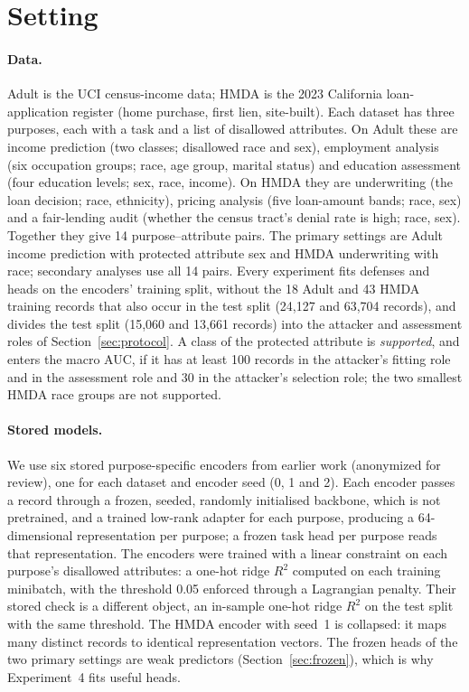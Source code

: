 \documentclass[10pt]{article}
\begin{document}
\section{Setting}\label{sec:setting}

\paragraph{Data.} Adult is the UCI census-income data; HMDA is the 2023 California loan-application register (home
purchase, first lien, site-built). Each dataset has three purposes, each with a task and a list of disallowed attributes.
On Adult these are income prediction (two classes; disallowed race and sex), employment analysis (six occupation groups;
race, age group, marital status) and education assessment (four education levels; sex, race, income). On HMDA they are
underwriting (the loan decision; race, ethnicity), pricing analysis (five loan-amount bands; race, sex) and a
fair-lending audit (whether the census tract's denial rate is high; race, sex). Together they give 14 purpose--attribute
pairs. The primary settings are Adult income prediction with protected attribute sex and HMDA underwriting with race;
secondary analyses use all 14 pairs. Every experiment fits defenses and heads on the encoders' training split, without the 18 Adult and 43 HMDA training
records that also occur in the test split (24{,}127 and 63{,}704 records), and divides the test split (15{,}060 and 13{,}661 records) into the attacker and
assessment roles of Section~\ref{sec:protocol}. A class of the protected attribute is \emph{supported}, and enters the
macro AUC, if it has at least 100 records in the attacker's fitting role and in the assessment role and 30 in the
attacker's selection role; the two smallest HMDA race groups are not supported.

\paragraph{Stored models.} We use six stored purpose-specific encoders from earlier work (anonymized for review), one for
each dataset and encoder seed (0, 1 and 2). Each encoder passes a record through a frozen, seeded, randomly initialised
backbone, which is not pretrained, and a trained low-rank adapter for each purpose, producing a 64-dimensional
representation per purpose; a frozen task head per purpose reads that representation. The encoders were trained with a
linear constraint on each purpose's disallowed attributes: a one-hot ridge $R^2$ computed on each training minibatch,
with the threshold 0.05 enforced through a Lagrangian penalty. Their stored check is a different object, an in-sample
one-hot ridge $R^2$ on the test split with the same threshold. The HMDA encoder with seed~1 is collapsed: it maps many
distinct records to identical representation vectors. The frozen heads of the two primary settings are weak predictors (Section~\ref{sec:frozen}), which is why Experiment~4
fits useful heads.
\end{document}
